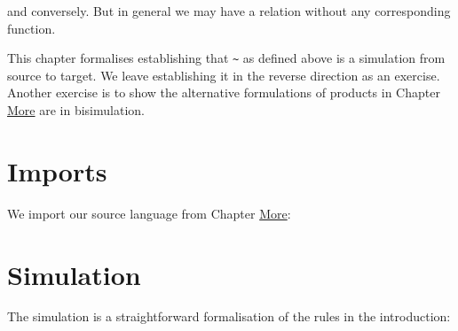 and conversely. But in general we may have a relation without any
corresponding function.

This chapter formalises establishing that \texttt{\textasciitilde{}} as
defined above is a simulation from source to target. We leave
establishing it in the reverse direction as an exercise. Another
exercise is to show the alternative formulations of products in Chapter
\protect\hyperlink{More}{More} are in bisimulation.

\hypertarget{imports}{%
\section{Imports}\label{imports}}

We import our source language from Chapter
\protect\hyperlink{More}{More}:

\begin{fence}
\begin{code}%
\>[0]\AgdaSpace{}%
\AgdaSpace{}%
\<%
\end{code}
\end{fence}

\hypertarget{simulation}{%
\section{Simulation}\label{simulation}}

The simulation is a straightforward formalisation of the rules in the
introduction:

